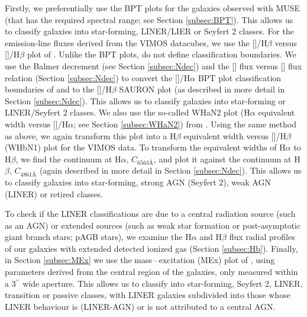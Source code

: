 	Firstly, we preferentially use the BPT plots for the galaxies observed with MUSE (that has the required spectral range; see Section \ref{subsec:BPT}). This allows us to classify galaxies into star-forming, LINER/LIER or Seyfert 2 classes. For the emission-line fluxes derived from the VIMOS datacubes, we use the []/H$\beta$ versus []/H$\beta$ plot of \citet[hereafter the SAURON plot]{Sarzi2010}. Unlike the BPT plots, \citet{Sarzi2010} do not define classification boundaries. We use the Balmer decrement (see Section \ref{subsec:Ndec}) and the [] flux versus [] flux relation (Section \ref{subsec:Ndec}) to convert the []/H$\alpha$ BPT plot classification boundaries of \citet{Kewley2001} and \citet{Kauffmann2003a} to the []/H$\beta$ SAURON plot (as described in more detail in Section \ref{subsec:Ndec}). This allows us to classify galaxies into star-forming or LINER/Seyfert 2 classes. We also use the so-called WHaN2 plot (H$\alpha$ equivalent width versus []/H$\alpha$; see Section \ref{subsec:WHaN2}) from \citet{CidFernandes2011}. Using the same method as above, we again transform this plot into a H$\beta$ equivalent width versus []/H$\beta$ (WHbN1) plot for the VIMOS data. To transform the equivalent widths of H$\alpha$ to H$\beta$, we find the continuum at H$\alpha$, $C_\text{6563\AA}$, and plot it against the continuum at H$\beta$, $C_\text{4861\AA}$ (again described in more detail in Section \ref{subsec:Ndec}). This allows us to classify galaxies into star-forming, strong AGN (Seyfert 2), weak AGN (LINER) or retired classes. 

	To check if the LINER classifications are due to a central radiation source (such as an AGN) or extended sources (such as weak star formation or post-asymptotic giant branch stars; pAGB stars), we examine the H$\alpha$ and H$\beta$ flux radial profiles of our galaxies with extended detected ionized gas (Section \ref{subsec:Hb}). Finally, in Section \ref{subsec:MEx} we use the mass\,--\,excitation (MEx) plot of \cite{Nyland2016}, using parameters derived from the central region of the galaxies, only measured within a 3$^{\prime\prime}$ wide aperture. This allows us to classify into star-forming, Seyfert 2, LINER, transition or passive classes, with LINER galaxies subdivided into those whose LINER behaviour is (LINER-AGN) or is not attributed to a central AGN. 

